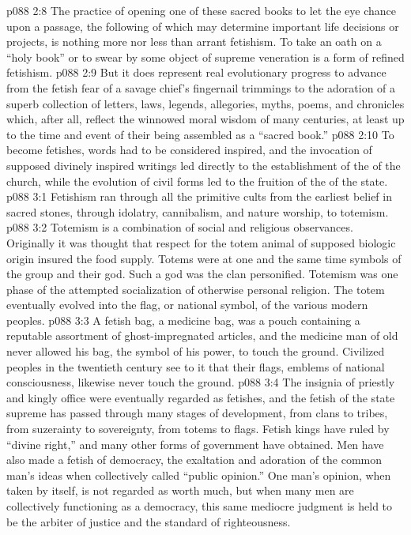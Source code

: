 \vs p088 2:8 The practice of opening one of these sacred books to let the eye chance upon a passage, the following of which may determine important life decisions or projects, is nothing more nor less than arrant fetishism. To take an oath on a “holy book” or to swear by some object of supreme veneration is a form of refined fetishism.
\vs p088 2:9 But it does represent real evolutionary progress to advance from the fetish fear of a savage chief’s fingernail trimmings to the adoration of a superb collection of letters, laws, legends, allegories, myths, poems, and chronicles which, after all, reflect the winnowed moral wisdom of many centuries, at least up to the time and event of their being assembled as a “sacred book.”
\vs p088 2:10 To become fetishes, words had to be considered inspired, and the invocation of supposed divinely inspired writings led directly to the establishment of the  of the church, while the evolution of civil forms led to the fruition of the  of the state.
\vs p088 3:1 Fetishism ran through all the primitive cults from the earliest belief in sacred stones, through idolatry, cannibalism, and nature worship, to totemism.
\vs p088 3:2 Totemism is a combination of social and religious observances. Originally it was thought that respect for the totem animal of supposed biologic origin insured the food supply. Totems were at one and the same time symbols of the group and their god. Such a god was the clan personified. Totemism was one phase of the attempted socialization of otherwise personal religion. The totem eventually evolved into the flag, or national symbol, of the various modern peoples.
\vs p088 3:3 A fetish bag, a medicine bag, was a pouch containing a reputable assortment of ghost\hyp{}impregnated articles, and the medicine man of old never allowed his bag, the symbol of his power, to touch the ground. Civilized peoples in the twentieth century see to it that their flags, emblems of national consciousness, likewise never touch the ground.
\vs p088 3:4 The insignia of priestly and kingly office were eventually regarded as fetishes, and the fetish of the state supreme has passed through many stages of development, from clans to tribes, from suzerainty to sovereignty, from totems to flags. Fetish kings have ruled by “divine right,” and many other forms of government have obtained. Men have also made a fetish of democracy, the exaltation and adoration of the common man’s ideas when collectively called “public opinion.” One man’s opinion, when taken by itself, is not regarded as worth much, but when many men are collectively functioning as a democracy, this same mediocre judgment is held to be the arbiter of justice and the standard of righteousness.
